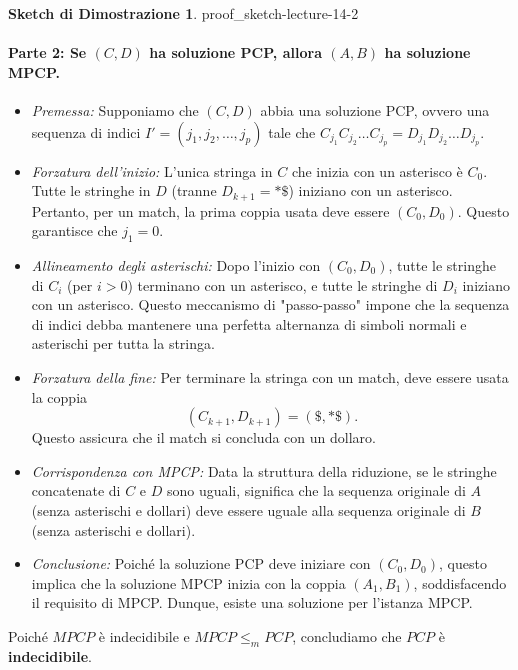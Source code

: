 \documentclass[a4paper]{article}
\theoremstyle{definition} %
\newtheorem{proof_sketch}{Sketch di Dimostrazione} %
\theoremstyle{remark} %
\begin{document}
\begin{proof_sketch}{}{{ proof_sketch-lecture-14-2 }}
\paragraph{Parte 2: Se $(C, D)$ ha soluzione PCP, allora $(A, B)$ ha soluzione MPCP.}

\begin{itemize}
    \item \emph{Premessa:} Supponiamo che $(C, D)$ abbia una soluzione PCP, ovvero una sequenza di indici $I' = (j_1, j_2, \dots, j_p)$ tale che $C_{j_1} C_{j_2} \dots C_{j_p} = D_{j_1} D_{j_2} \dots D_{j_p}$.
    
    \item \emph{Forzatura dell'inizio:} L'unica stringa in $C$ che inizia con un asterisco è $C_0$. Tutte le stringhe in $D$ (tranne $D_{k+1}=*\$$) iniziano con un asterisco. Pertanto, per un match, la prima coppia usata deve essere $(C_0, D_0)$. Questo garantisce che $j_1 = 0$.
    
    \item \emph{Allineamento degli asterischi:} Dopo l'inizio con $(C_0, D_0)$, tutte le stringhe di $C_i$ (per $i>0$) terminano con un asterisco, e tutte le stringhe di $D_i$ iniziano con un asterisco. Questo meccanismo di "passo-passo" impone che la sequenza di indici debba mantenere una perfetta alternanza di simboli normali e asterischi per tutta la stringa.
    
    \item \emph{Forzatura della fine:} Per terminare la stringa con un match, deve essere usata la coppia
    $$(C_{k+1}, D_{k+1}) = (\$, *\$).$$
    Questo assicura che il match si concluda con un dollaro.
    
    \item \emph{Corrispondenza con MPCP:} Data la struttura della riduzione, se le stringhe concatenate di $C$ e $D$ sono uguali, significa che la sequenza originale di $A$ (senza asterischi e dollari) deve essere uguale alla sequenza originale di $B$ (senza asterischi e dollari).
    
    \item \emph{Conclusione:} Poiché la soluzione PCP deve iniziare con $(C_0, D_0)$, questo implica che la soluzione MPCP inizia con la coppia $(A_1, B_1)$, soddisfacendo il requisito di MPCP. Dunque, esiste una soluzione per l'istanza MPCP.
\end{itemize}
\end{proof_sketch}

Poiché $MPCP$ è indecidibile e $MPCP \le_m PCP$, concludiamo che $PCP$ è \textbf{indecidibile}.
\end{document}
